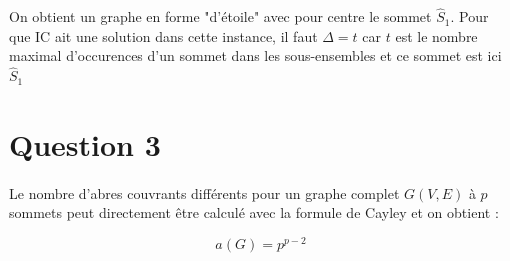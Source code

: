 \documentclass[11pt]{article}
\begin{document}
On obtient un graphe en forme "d'étoile" avec pour centre le sommet $\widehat{S}_1$. Pour que IC ait une solution
dans cette instance, il faut $\Delta = t$ car $t$ est le nombre maximal d'occurences d'un sommet dans les sous-ensembles
et ce sommet est ici $\widehat{S}_1$

\section{Question 3}
\paragraph{}
Le nombre d'abres couvrants différents pour un graphe complet $G(V,E)$ à $p$ sommets peut directement être calculé
avec la formule de Cayley et on obtient :

\begin{equation}
	a(G) = p^{p-2} 
\end{equation}
\end{document}
